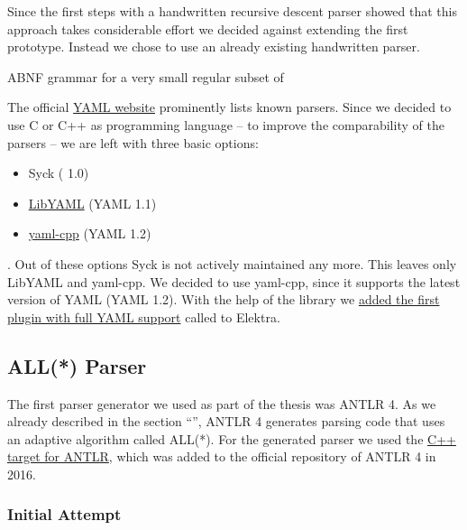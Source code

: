 Since the first steps with a handwritten recursive descent parser showed that this approach takes considerable effort we decided against extending the first prototype. Instead we chose to use an already existing handwritten  parser.

\begin{listing}
  \centering
  \begin{code-boxed}
    
  \end{code-boxed}
  \caption{ABNF grammar for a very small regular subset of }
  \label{cod:abnf_recurive_descent}
\end{listing}

The official \href{http://yaml.org}{YAML website} prominently lists known  parsers. Since we decided to use C or C++ as programming language – to improve the comparability of the parsers – we are left with three basic options:

\begin{itemize}
  \item Syck ( 1.0)
  \item \href{https://github.com/yaml/libyaml}{LibYAML} (YAML 1.1)
  \item \href{https://github.com/jbeder/yaml-cpp}{yaml-cpp} (YAML 1.2)
\end{itemize}

. Out of these options Syck is not actively maintained any more. This leaves only LibYAML and yaml-cpp. We decided to use yaml-cpp, since it supports the latest version of YAML (YAML 1.2). With the help of the library we \href{https://github.com/ElektraInitiative/libelektra/pull/1613}{added the first plugin with full YAML support} called \LinkYAMLCPP{} to Elektra.

\subsection{ALL(*) Parser}

The first parser generator we used as part of the thesis was \gls{ANTLR} 4. As we already described in the section “”, \gls{ANTLR} 4 generates parsing code that uses an adaptive  algorithm called ALL(*). For the generated parser we used the \href{https://github.com/antlr/antlr4/pull/1210}{C++ target for ANTLR}, which was added to the official repository of \gls{ANTLR} 4 in 2016.

\subsubsection{Initial Attempt}

